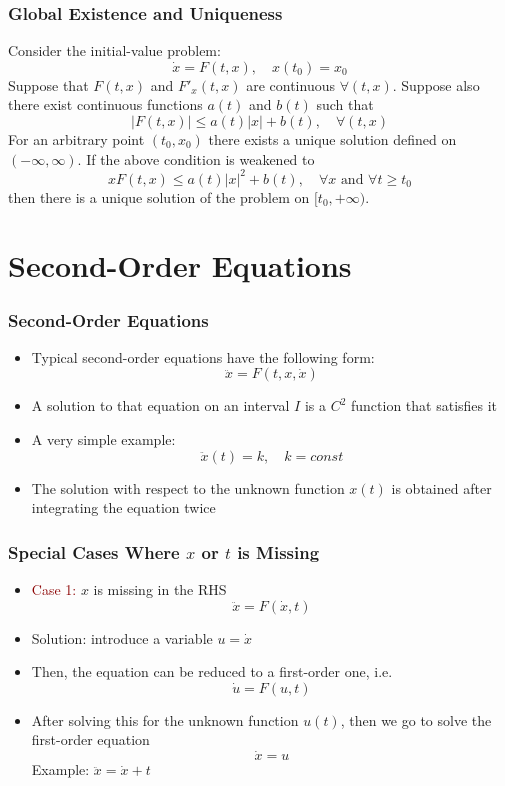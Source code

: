 \documentclass[10pt,usenames,dvipsnames]{beamer}
\theoremstyle{definition}
\begin{document}
\begin{frame}[fragile]
\frametitle{Global Existence and Uniqueness}
\begin{theorem}
	Consider the initial-value problem:
	\[
		\dot{x} = F(t,x), \quad x(t_{0}) = x_{0}
	\]
	Suppose that $F(t,x)$ and $F'_{x}(t,x)$ are continuous $\forall (t,x)$. Suppose also there exist continuous functions $a(t)$ and $b(t)$ such that
	\[
		|F(t,x)| \leq a(t)|x| + b(t), \quad \forall (t,x)
	\]
	For an arbitrary point $(t_{0},x_{0})$ there exists a unique solution defined on $(-\infty,\infty)$. If the above condition is weakened to
	\[
		xF(t,x) \leq a(t)|x|^{2} + b(t), \quad \forall x \textrm{ and } \forall t \geq t_{0}
	\]
	then there is a unique solution of the problem on $[t_{0},+\infty)$.
\end{theorem}
\end{frame}

\section{Second-Order Equations}
\begin{frame}[fragile]
\frametitle{Second-Order Equations}
\begin{itemize}
	\item Typical second-order equations have the following form:
	\[
		\ddot{x} = F(t,x,\dot{x})
	\]
	\item A solution to that equation on an interval $I$ is a $C^{2}$ function that satisfies it
	\item A very simple example:
	\[
		\ddot{x}(t) = k,\quad k = const
	\]
	\item The solution with respect to the unknown function $x(t)$ is obtained after integrating the equation twice
\end{itemize}
\end{frame}

\begin{frame}[fragile]
\frametitle{Special Cases Where $x$ or $t$ is Missing}
\begin{itemize}
	\item \textcolor{darkred}{Case 1:} $x$ is missing in the RHS
	\[
		\ddot{x} = F(\dot{x},t)
	\]
	\item Solution: introduce a variable $u = \dot{x}$
	\item Then, the equation can be reduced to a first-order one, i.e.
	\[
		\dot{u} = F(u,t)
	\]
	\item After solving this for the unknown function $u(t)$, then we go to solve the first-order equation
	\[
		\dot{x} = u
	\]
	\color{orange}
	Example: $\ddot{x} = \dot{x} + t$
	\color{black}
\end{itemize}
\end{frame}
\end{document}
